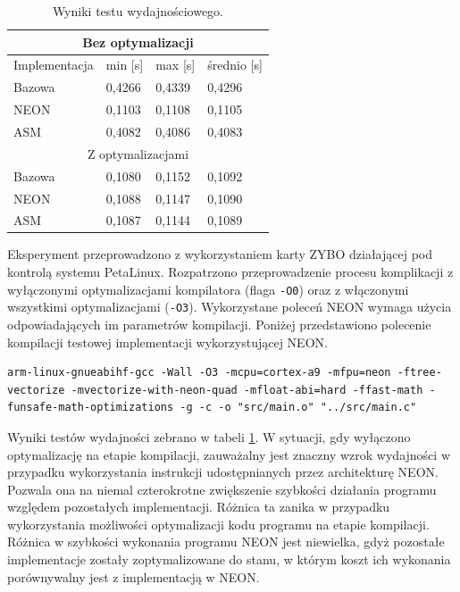 \begin{table}[h]
	\caption{Wyniki testu wydajnościowego.}
	\centering
	\label{tab:neon-time-results}
	\begin{tabular}{|l|l|l|l|}
		\hline
		\multicolumn{4}{|c|}{Bez optymalizacji} \\ \hline
		Implementacja & min {[}s{]} & max {[}s{]} & średnio {[}s{]} \\ \hline
		Bazowa & 0,4266 & 0,4339 & 0,4296 \\ \hline
		NEON & 0,1103 & 0,1108 & 0,1105 \\ \hline
		ASM & 0,4082 & 0,4086 & 0,4083 \\ \hline
		\multicolumn{4}{|c|}{Z optymalizacjami} \\ \hline
		Bazowa & 0,1080 & 0,1152 & 0,1092 \\ \hline
		NEON & 0,1088 & 0,1147 & 0,1090 \\ \hline
		ASM & 0,1087 & 0,1144 & 0,1089 \\ \hline
	\end{tabular}
\end{table}

Eksperyment przeprowadzono z wykorzystaniem karty ZYBO działającej pod kontrolą systemu PetaLinux.
Rozpatrzono przeprowadzenie procesu komplikacji z wyłączonymi optymalizacjami kompilatora (flaga \texttt{-O0}) oraz z włączonymi wszystkimi optymalizacjami (\texttt{-O3}).
Wykorzystane poleceń NEON wymaga użycia odpowiadających im parametrów kompilacji. 
Poniżej przedstawiono polecenie kompilacji testowej implementacji wykorzystującej NEON.

\begin{lstlisting}[breaklines]
arm-linux-gnueabihf-gcc -Wall -O3 -mcpu=cortex-a9 -mfpu=neon -ftree-vectorize -mvectorize-with-neon-quad -mfloat-abi=hard -ffast-math -funsafe-math-optimizations -g -c -o "src/main.o" "../src/main.c"
\end{lstlisting}

Wyniki testów wydajności zebrano w tabeli \ref{tab:neon-time-results}. %
W sytuacji, gdy wyłączono optymalizację na etapie kompilacji, zauważalny jest znaczny wzrok wydajności w przypadku wykorzystania instrukcji udostępnianych przez architekturę NEON. 
Pozwala ona na niemal czterokrotne zwiększenie szybkości działania programu względem pozostałych implementacji. 
Różnica ta zanika w przypadku wykorzystania możliwości optymalizacji kodu programu na etapie kompilacji. 
Różnica w szybkości wykonania programu NEON jest niewielka, gdyż pozostałe implementacje zostały zoptymalizowane do stanu, w którym koszt ich wykonania porównywalny jest z implementacją w NEON. %

